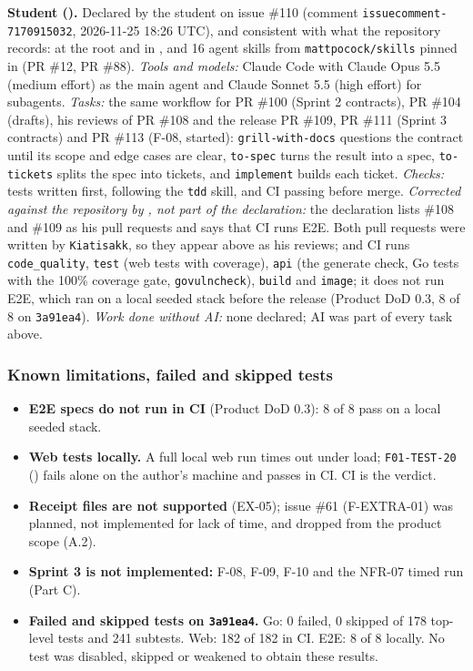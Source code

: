 \begin{sloppypar}
\textbf{Student \studentTwoId{} (\studentTwoName).} Declared by the student on issue \#110 (comment \texttt{issuecomment-7170915032}, 2026-11-25 18:26 UTC), and consistent with what the repository records:  at the root and in , and 16 agent skills from \texttt{mattpocock/skills} pinned in  (PR \#12, PR \#88). \textit{Tools and models:} Claude Code with Claude Opus 5.5 (medium effort) as the main agent and Claude Sonnet 5.5 (high effort) for subagents. \textit{Tasks:} the same workflow for PR \#100 (Sprint 2 contracts), PR \#104 (drafts), his reviews of PR \#108 and the release PR \#109, PR \#111 (Sprint 3 contracts) and PR \#113 (F-08, started): \texttt{grill-with-docs} questions the contract until its scope and edge cases are clear, \texttt{to-spec} turns the result into a spec, \texttt{to-tickets} splits the spec into tickets, and \texttt{implement} builds each ticket. \textit{Checks:} tests written first, following the \texttt{tdd} skill, and CI passing before merge. \textit{Corrected against the repository by \studentOneName{}, not part of the declaration:} the declaration lists \#108 and \#109 as his pull requests and says that CI runs E2E. Both pull requests were written by \texttt{Kiatisakk}, so they appear above as his reviews; and CI runs \texttt{code\_quality}, \texttt{test} (web tests with coverage), \texttt{api} (the generate check, Go tests with the 100\% coverage gate, \texttt{govulncheck}), \texttt{build} and \texttt{image}; it does not run E2E, which ran on a local seeded stack before the release (Product DoD 0.3, 8 of 8 on \texttt{3a91ea4}). \textit{Work done without AI:} none declared; AI was part of every task above.
\end{sloppypar}

\subsubsection*{Known limitations, failed and skipped tests}

\begin{itemize}\setlength\itemsep{2pt}
\item \textbf{E2E specs do not run in CI} (Product DoD 0.3): 8 of 8 pass on a local seeded stack.
\item \textbf{Web tests locally.} A full local web run times out under load; \texttt{F01-TEST-20} () fails alone on the author's machine and passes in CI. CI is the verdict.
\item \textbf{Receipt files are not supported} (EX-05); issue \#61 (F-EXTRA-01) was planned, not implemented for lack of time, and dropped from the product scope (A.2).
\item \textbf{Sprint 3 is not implemented:} F-08, F-09, F-10 and the NFR-07 timed run (Part C).
\item \textbf{Failed and skipped tests on \texttt{3a91ea4}.} Go: 0 failed, 0 skipped of 178 top-level tests and 241 subtests. Web: 182 of 182 in CI. E2E: 8 of 8 locally. No test was disabled, skipped or weakened to obtain these results.
\end{itemize}
